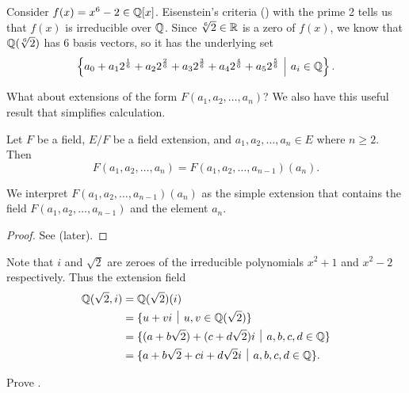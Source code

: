 \begin{example}
    Consider $f(x) = x^6 - 2 \in \mathbb{Q}[x]$. Eisenstein's criteria () with the prime 2 tells us that $f(x)$ is irreducible over $\mathbb{Q}$. Since $\sqrt[6]2 \in \mathbb{R}$ is a zero of $f(x)$, we know that $\mathbb{Q}(\sqrt[6]2)$ has 6 basis vectors, so it has the underlying set
    \[
        \left\{a_0 + a_12^{\frac16} + a_22^{\frac26} + a_32^{\frac36} + a_42^{\frac46} + a_52^{\frac56} \vert a_i \in \Q\right\}.
    \]
\end{example}

What about extensions of the form $F(a_1, a_2, \dots, a_n)$? We also have this useful result that simplifies calculation.
\begin{proposition}\label{prop-field-generated-by-S-inductive-definition}
    Let $F$ be a field, $E/F$ be a field extension, and $a_1, a_2, \dots, a_n \in E$ where $n \geq 2$. Then
    \[
        F(a_1, a_2, \dots, a_n) = F(a_1, a_2, \dots, a_{n-1})(a_n).
    \]
\end{proposition}
\begin{remark}
    We interpret $F(a_1, a_2, \dots, a_{n-1})(a_n)$ as the simple extension that contains the field $F(a_1, a_2, \dots, a_{n-1})$ and the element $a_n$.
\end{remark}
\begin{proof}
    See  (later).
\end{proof}

\begin{example}
    Note that $i$ and $\sqrt 2$ are zeroes of the irreducible polynomials $x^2 + 1$ and $x^2 - 2$ respectively. Thus the extension field
    \begin{align*}
        \Q(\sqrt 2, i) &= \Q(\sqrt 2)(i)\\
        &= \{u + vi \vert u,v \in \Q(\sqrt2)\}\\
        &= \{(a+b\sqrt2) + (c+d\sqrt2)i \vert a, b, c, d \in \Q\}\\
        &= \{a + b\sqrt2 + ci + d\sqrt2i \vert a, b, c, d \in \Q\}.
    \end{align*}
\end{example}

\begin{exercise}\label{exercise-field-generated-by-S-inductive-definition}
    Prove .
\end{exercise}

\newpage

